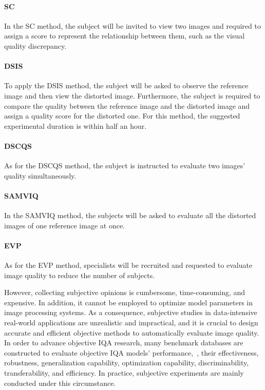 	\paragraph{SC} In the SC method, the subject will be invited to view two images and required to assign a score to represent the relationship between them, such as the visual quality discrepancy.
	
	\paragraph{DSIS} To apply the DSIS method, the subject will be asked to observe the reference image and then view the distorted image. Furthermore, the subject is required to compare the quality between the reference image and the distorted image and assign a quality score for the distorted one. For this method, the suggested experimental duration is within half an hour.
	
	\paragraph{DSCQS} As for the DSCQS method, the subject is instructed to evaluate two images' quality simultaneously.
	
	\paragraph{SAMVIQ} In the SAMVIQ method, the subjects will be asked to evaluate all the distorted images of one reference image at once.
	
	\paragraph{EVP} As for the EVP method, specialists will be recruited and requested to evaluate image quality to reduce the number of subjects.
	
	However, collecting subjective opinions is cumbersome, time-consuming, and expensive. In addition, it cannot be employed to optimize model parameters in image processing systems. As a consequence, subjective studies in data-intensive real-world applications are unrealistic and impractical, and it is crucial to design accurate and efficient objective methods to automatically evaluate image quality. In order to advance objective IQA research, many benchmark databases are constructed to evaluate objective IQA models' performance,~\eg, their effectiveness, robustness, generalization capability, optimization capability, discriminability, transferability, and efficiency. In practice, subjective experiments are mainly conducted under this circumstance. 
	
